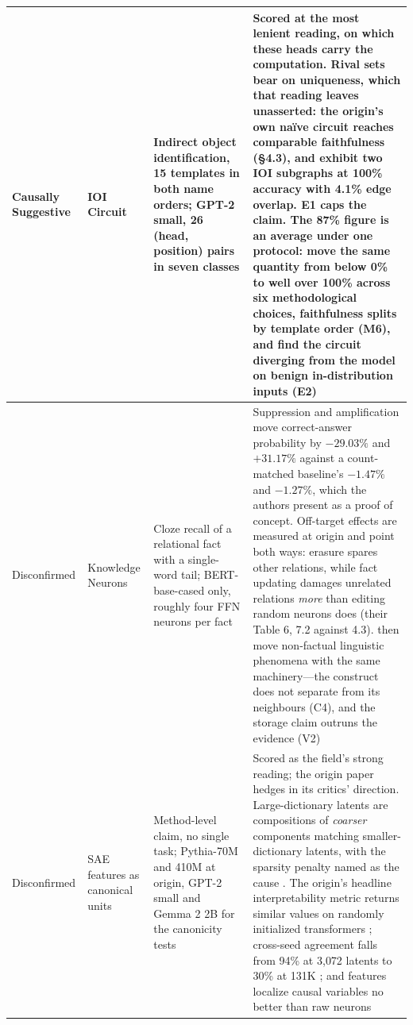 \documentclass{article}
\begin{document}
{\begin{longtable}{@{}>{\raggedright\arraybackslash}p{2.2cm}>{\raggedright\arraybackslash}p{2.2cm}>{\raggedright\arraybackslash}p{3.4cm}>{\raggedright\arraybackslash}p{7.4cm}@{}}
Causally Suggestive & IOI Circuit \citep{wang2023interpretability} & Indirect object identification, 15 templates in both name orders; GPT-2 small, 26 (head, position) pairs in seven classes & Scored at the most lenient reading, on which these heads carry the computation. Rival sets bear on uniqueness, which that reading leaves unasserted: the origin's own na\"ive circuit reaches comparable faithfulness (\S4.3), and \citet{chen2026circuits} exhibit two IOI subgraphs at 100\% accuracy with 4.1\% edge overlap. E1 caps the claim. The 87\% figure is an average under one protocol: \citet{miller2024transformer} move the same quantity from below 0\% to well over 100\% across six methodological choices, faithfulness splits by template order (M6), and \citet{uitdebos2024adversarial} find the circuit diverging from the model on benign in-distribution inputs (E2) \\
\midrule
Disconfirmed & Knowledge Neurons \citep{dai2022knowledge} & Cloze recall of a relational fact with a single-word tail; BERT-base-cased only, roughly four FFN neurons per fact & Suppression and amplification move correct-answer probability by $-29.03\%$ and $+31.17\%$ against a count-matched baseline's $-1.47\%$ and $-1.27\%$, which the authors present as a proof of concept. Off-target effects are measured at origin and point both ways: erasure spares other relations, while fact updating damages unrelated relations \emph{more} than editing random neurons does (their Table 6, 7.2 against 4.3). \citet{niu2024knowledge} then move non-factual linguistic phenomena with the same machinery---the construct does not separate from its neighbours (C4), and the storage claim outruns the evidence (V2) \\
\midrule
Disconfirmed & SAE features as canonical units \citep{cunningham2023sparse, leask2025canonical} & Method-level claim, no single task; Pythia-70M and 410M at origin, GPT-2 small and Gemma 2 2B for the canonicity tests & Scored as the field's strong reading; the origin paper hedges in its critics' direction. Large-dictionary latents are compositions of \emph{coarser} components matching smaller-dictionary latents, with the sparsity penalty named as the cause \citep{leask2025canonical}. The origin's headline interpretability metric returns similar values on randomly initialized transformers \citep{heap2025sparse}; cross-seed agreement falls from 94\% at 3{,}072 latents to 30\% at 131K \citep{paulo2025sparse}; and features localize causal variables no better than raw neurons \citep{mueller2025mib} \\

\end{longtable}}
\end{document}
